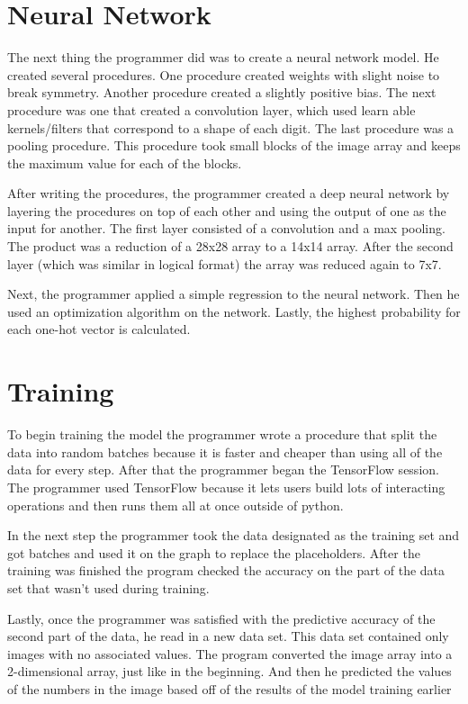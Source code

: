 \documentclass{article}
\begin{document}
\section{Neural Network}

The next thing the programmer did was to create a neural network model. He created several procedures. One procedure created weights with slight noise to break symmetry. Another procedure created a slightly positive bias. The next procedure was one that created a convolution layer, which used learn able kernels/filters that correspond to a shape of each digit. The last procedure was a pooling procedure. This procedure took small blocks of the image array and keeps the maximum value for each of the blocks.

After writing the procedures, the programmer created a deep neural network by layering the procedures on top of each other and using the output of one as the input for another. The first layer consisted of a convolution and a max pooling. The product was a reduction of a 28x28 array to a 14x14 array. After the second layer (which was similar in logical format) the array was reduced again to 7x7.

Next, the programmer applied a simple regression to the neural network. Then he used an optimization algorithm on the network. Lastly, the highest probability for each one-hot vector is calculated.

\section{Training}

To begin training the model the programmer wrote a procedure that split the data into random batches because it is faster and cheaper than using all of the data for every step. After that the programmer began the TensorFlow session. The programmer used TensorFlow because it lets users build lots of interacting operations and then runs them all at once outside of python. 

In the next step the programmer took the data designated as the training set and got batches and used it on the graph to replace the placeholders. After the training was finished the program checked the accuracy on the part of the data set that wasn't used during training.

Lastly, once the programmer was satisfied with the predictive accuracy of the second part of the data, he read in a new data set. This data set contained only images with no associated values. The program converted the image array into a 2-dimensional array, just like in the beginning. And then he predicted the values of the numbers in the image based off of the results of the model training earlier
\end{document}
